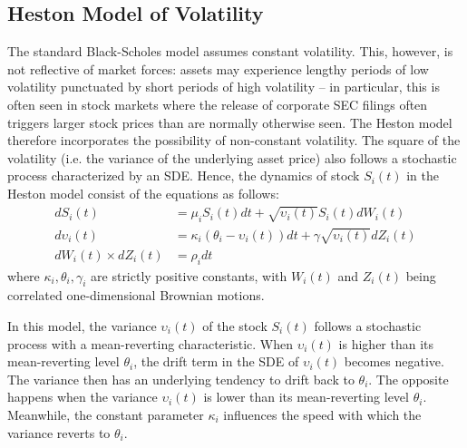 \documentclass{article}
\begin{document}
\subsection{Heston Model of Volatility}
	The standard Black-Scholes model assumes constant volatility. This, however, is not reflective of market forces: assets may experience lengthy periods of low volatility punctuated by short periods of high volatility -- in particular, this is often seen in stock markets where the release of corporate SEC filings often triggers larger stock prices than are normally otherwise seen. The Heston model therefore incorporates the possibility of non-constant volatility. The square of the volatility (i.e. the variance of the underlying asset price) also follows a stochastic process characterized by an SDE. Hence, the dynamics of stock $S_i(t)$ in the Heston model consist of the equations as follows:
	\begin{align*}
	dS_i(t) &= \mu_i S_i(t) dt + \sqrt{\upsilon_i(t)} S_i(t) dW_i(t) \\
	d\upsilon_i(t) &= \kappa_i (\theta_i - \upsilon_i(t)) dt + \gamma \sqrt{\upsilon_i(t)} dZ_i(t) \\
	dW_i(t) \times dZ_i(t) &= \rho_i dt
	\end{align*}
	where $\kappa_i, \theta_i, \gamma_i$ are strictly positive constants, with $W_i(t)$ and $Z_i(t)$ being correlated one-dimensional Brownian motions.
    
	In this model, the variance $\upsilon_i(t)$ of the stock $S_i(t)$ follows a stochastic process with a mean-reverting characteristic. When $\upsilon_i(t)$ is higher than its mean-reverting level $\theta_i$, the drift term in the SDE of $\upsilon_i(t)$ becomes negative. The variance then has an underlying tendency to drift back to $\theta_i$. The opposite happens when the variance $\upsilon_i(t)$ is lower than its mean-reverting level $\theta_i$. Meanwhile, the constant parameter $\kappa_i$ influences the speed with which the variance reverts to $\theta_i$. 
	
\end{document}
